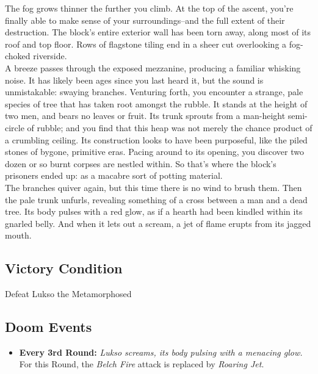 The fog grows thinner the further you climb. At the top of the ascent, you’re finally able to make sense of your surroundings--and the full extent of their destruction. The block's entire exterior wall has been torn away, along most of its roof and top floor. Rows of flagstone tiling end in a sheer cut overlooking a fog-choked riverside.\\

A breeze passes through the exposed mezzanine, producing a familiar whisking noise. It has likely been ages since you last heard it, but the sound is unmistakable: swaying branches. Venturing forth, you encounter a strange, pale species of tree that has taken root amongst the rubble. It stands at the height of two men, and bears no leaves or fruit. Its trunk sprouts from a man-height semi-circle of rubble; and you find that this heap was not merely the chance product of a crumbling ceiling. Its construction looks to have been purposeful, like the piled stones of bygone, primitive eras. Pacing around to its opening, you discover two dozen or so burnt corpses are nestled within. So that's where the block's prisoners ended up: as a macabre sort of potting material.\\

The branches quiver again, but this time there is no wind to brush them. Then the pale trunk unfurls, revealing something of a cross between a man and a dead tree. Its body pulses with a red glow, as if a hearth had been kindled within its gnarled belly. And when it lets out a scream, a jet of flame erupts from its jagged mouth.\\

\subsection*{Victory Condition}
Defeat Lukso the Metamorphosed

\begin{tcolorbox}
\subsection*{Doom Events}
\begin{itemize}
\item \textbf{Every 3rd Round:} \emph{Lukso screams, its body pulsing with a menacing glow.} For this Round, the \emph{Belch Fire} attack is replaced by \emph{Roaring Jet}.
\end{itemize}
\end{tcolorbox}

